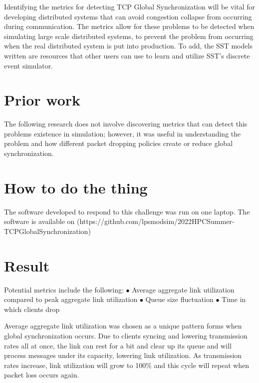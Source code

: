 \documentclass{article}
\begin{document}
Identifying the metrics for detecting TCP Global Synchronization will be vital for developing distributed systems that can avoid congestion collapse from occurring during communication. The metrics allow for these problems to be detected when simulating large scale distributed systems, to prevent the problem from occurring when the real distributed system is put into production. To add, the SST models written are resources that other users can use to learn and utilize SST's discrete event simulator.

\section{Prior work} %
The following research does not involve discovering metrics that can detect this problems existence in simulation; however, it was useful in understanding the problem and how different packet dropping policies create or reduce global synchronization. \cite{Bashi2017}

\section{How to do the thing}

The software developed to respond to this challenge was run on one laptop.
The software is available on (https://github.com/lpsmodsim/2022HPCSummer-TCPGlobalSynchronization)

\section{Result} %

Potential metrics include the following:\newline
	$\bullet$ Average aggregate link utilization compared to peak aggregate link utilization \newline
	$\bullet$ Queue size fluctuation \newline
	$\bullet$ Time in which clients drop \newline\newline

	Average aggregate link utilization was chosen as a unique pattern forms when global synchronization occurs. Due to clients syncing and lowering transmission rates all at once, the link can rest for a bit and clear up its queue and will process messages under its capacity, lowering link utilization. As transmission rates increase, link utilization will grow to 100\% and this cycle will repeat when packet loss occurs again.\newline
	
\end{document}
